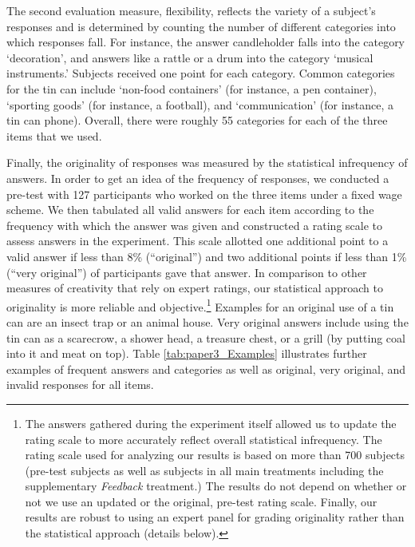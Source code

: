 The second evaluation measure, flexibility, reflects the variety of a
subject's responses and is determined by counting the number of different categories into which 
responses fall. For instance, the answer candleholder falls into the category `decoration', 
and  answers like a rattle or a 
drum into the category `musical instruments.' 
Subjects received one point for each category. 
Common categories for the tin can include `non-food containers' 
(for instance, a pen container), `sporting goods' (for instance, a football), 
and `communication' (for instance, a tin can phone).  Overall, there were roughly 
55 categories for each of the three items that we used. 
 
Finally, the originality of responses was measured by the statistical infrequency of answers.
 In order to get an idea of the frequency of responses, 
we conducted a pre-test with 127 participants who worked on the three 
items under a fixed wage scheme. 
We then tabulated all valid answers for each item according to the frequency 
with which the answer was given and constructed a rating scale to assess 
answers in the experiment. This scale allotted one additional point to a 
valid answer if less than 8\% (``original'') and two additional points if less than 1\% (``very original'') of participants gave
 that answer. In comparison to other measures of creativity that rely on expert ratings, 
our  statistical approach to originality is more reliable and objective.\footnote{The answers gathered during the experiment itself allowed 
us to update the rating scale to more accurately reflect overall statistical infrequency. 
The rating scale used for analyzing our results is based on more than 
   700 subjects (pre-test subjects as well as subjects in all main treatments including the
 supplementary \textit{Feedback} treatment.) The results do not depend on 
whether or not we use an updated or the original, pre-test rating scale. Finally, our results are robust 
to using an expert panel for grading originality rather than the statistical approach (details  below). }
 Examples for an original use of a tin can are an insect trap or an animal 
house. Very original answers include using the tin can as a scarecrow, 
a shower head, a treasure chest, or a grill (by putting coal into it and meat on top). Table \ref{tab:paper3_Examples} illustrates 
further examples of frequent answers and categories as well as original, very original, 
and invalid responses for all items. 

